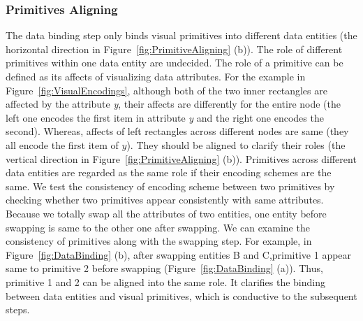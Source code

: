 \subsubsection{Primitives Aligning}
The data binding step only binds visual primitives into different data entities (the horizontal direction in Figure~\ref{fig:PrimitiveAligning} (b)).
The role of different primitives within one data entity are undecided.
The role of a primitive can be defined as its affects of visualizing data attributes.
For the example in Figure~\ref{fig:VisualEncodings}, although both of the two inner rectangles are affected by the attribute \textit{y}, their affects are differently for the entire node (the left one encodes the first item in attribute \textit{y} and the right one encodes the second).
Whereas, affects of left rectangles across different nodes are same (they all encode the first item of $y$).
They should be aligned to clarify their roles (the vertical direction in Figure~\ref{fig:PrimitiveAligning} (b)).
Primitives across different data entities are regarded as the same role if their encoding schemes are the same.
We test the consistency of encoding scheme between two primitives by checking whether two primitives appear consistently with same attributes.
Because we totally swap all the attributes of two entities, one entity before swapping is same to the other one after swapping.
We can examine the consistency of primitives along with the swapping step.
For example, in Figure~\ref{fig:DataBinding} (b), after swapping entities B and C,primitive 1 appear same to primitive 2 before swapping (Figure~\ref{fig:DataBinding} (a)). Thus, primitive 1 and 2 can be aligned into the same role.
It clarifies the binding between data entities and visual primitives, which is conductive to the subsequent steps.


